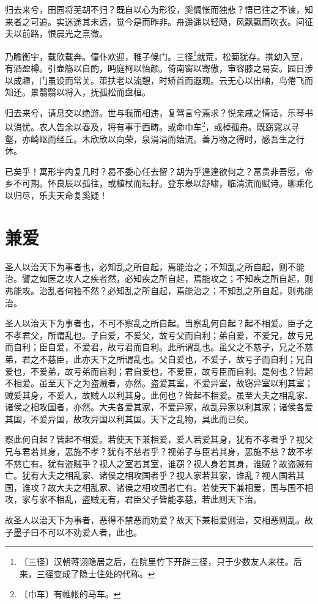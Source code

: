 \documentclass[12pt,UTF-8,openany]{ctexbook}
\begin{document}
\begin{normalsize}
    
    归去来兮，田园将芜胡不归？既自以心为形役，奚惆怅而独悲？悟已往之不谏，知来者之可追。实迷途其未远，觉今是而昨非。舟遥遥以轻飏，风飘飘而吹衣。问征夫以前路，恨晨光之熹微。
    
    乃瞻衡宇，载欣载奔。僮仆欢迎，稚子候门。三径\footnote{〔三径〕汉朝蒋诩隐居之后，在院里竹下开辟三径，只于少数友人来往。后来，三径变成了隐士住处的代称。}就荒，松菊犹存。携幼入室，有酒盈樽。引壶觞以自酌，眄庭柯以怡颜。倚南窗以寄傲，审容膝之易安。园日涉以成趣，门虽设而常关。策扶老以流憩，时矫首而遐观。云无心以出岫，鸟倦飞而知还。景翳翳以将入，抚孤松而盘桓。
    
    归去来兮，请息交以绝游。世与我而相违，复驾言兮焉求？悦亲戚之情话，乐琴书以消忧。农人告余以春及，将有事于西畴。或命巾车\footnote{〔巾车〕有帷帐的马车。}，或棹孤舟。既窈窕以寻壑，亦崎岖而经丘。木欣欣以向荣，泉涓涓而始流。善万物之得时，感吾生之行休。
    
    已矣乎！寓形宇内复几时？曷不委心任去留？胡为乎遑遑欲何之？富贵非吾愿，帝乡不可期。怀良辰以孤往，或植杖而耘耔。登东皋以舒啸，临清流而赋诗。聊乘化以归尽，乐夫天命复奚疑！
\end{normalsize}



\chapter{兼爱}

\begin{normalsize}
    
    圣人以治天下为事者也，必知乱之所自起，焉能治之；不知乱之所自起，则不能治。譬之如医之攻人之疾者然，必知疾之所自起，焉能攻之；不知疾之所自起，则弗能攻。治乱者何独不然？必知乱之所自起，焉能治之；不知乱之所自起，则弗能治。
    
    圣人以治天下为事者也，不可不察乱之所自起。当察乱何自起？起不相爱。臣子之不孝君父，所谓乱也。子自爱，不爱父，故亏父而自利；弟自爱，不爱兄，故亏兄而自利；臣自爱，不爱君，故亏君而自利。此所谓乱也。虽父之不慈子，兄之不慈弟，君之不慈臣，此亦天下之所谓乱也。父自爱也，不爱子，故亏子而自利；兄自爱也，不爱弟，故亏弟而自利；君自爱也，不爱臣，故亏臣而自利。是何也？皆起不相爱。虽至天下之为盗贼者，亦然。盗爱其室，不爱异室，故窃异室以利其室；贼爱其身，不爱人，故贼人以利其身。此何也？皆起不相爱。虽至大夫之相乱家、诸侯之相攻国者，亦然。大夫各爱其家，不爱异家，故乱异家以利其家；诸侯各爱其国，不爱异国，故攻异国以利其国。天下之乱物，具此而已矣。
    
    察此何自起？皆起不相爱。若使天下兼相爱，爱人若爱其身，犹有不孝者乎？视父兄与君若其身，恶施不孝？犹有不慈者乎？视弟子与臣若其身，恶施不慈？故不孝不慈亡有。犹有盗贼乎？视人之室若其室，谁窃？视人身若其身，谁贼？故盗贼有亡。犹有大夫之相乱家、诸侯之相攻国者乎？视人家若其家，谁乱？视人国若其国，谁攻？故大夫之相乱家、诸侯之相攻国者亡有。若使天下兼相爱，国与国不相攻，家与家不相乱，盗贼无有，君臣父子皆能孝慈，若此则天下治。
    
    故圣人以治天下为事者，恶得不禁恶而劝爱？故天下兼相爱则治，交相恶则乱。故子墨子曰不可以不劝爱人者，此也。
\end{normalsize}
\end{document}
